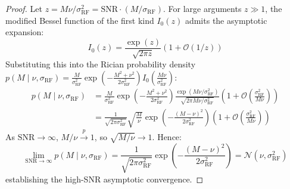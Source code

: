 \documentclass{article}
\begin{document}
\begin{proof}
Let $z = M \nu / \sigma_{\text{RF}}^2 = \text{SNR} \cdot (M / \sigma_{\text{RF}})$. For large arguments $z \gg 1$, the modified Bessel function of the first kind $I_0(z)$ admits the asymptotic expansion:
\begin{equation}
    I_0(z) = \frac{\exp(z)}{\sqrt{2\pi z}} \left( 1 + \mathcal{O}(1/z) \right)
\end{equation}
Substituting this into the Rician probability density $p(M \mid \nu, \sigma_{\text{RF}}) = \frac{M}{\sigma_{\text{RF}}^2} \exp\left(-\frac{M^2 + \nu^2}{2\sigma_{\text{RF}}^2}\right) I_0\left(\frac{M\nu}{\sigma_{\text{RF}}^2}\right)$:
\begin{align}
    p(M \mid \nu, \sigma_{\text{RF}}) &= \frac{M}{\sigma_{\text{RF}}^2} \exp\left(-\frac{M^2 + \nu^2}{2\sigma_{\text{RF}}^2}\right) \frac{\exp(M\nu / \sigma_{\text{RF}}^2)}{\sqrt{2\pi M\nu / \sigma_{\text{RF}}^2}} \left( 1 + \mathcal{O}\left(\frac{\sigma_{\text{RF}}^2}{M\nu}\right) \right) \\
    &= \frac{1}{\sqrt{2\pi \sigma_{\text{RF}}^2}} \sqrt{\frac{M}{\nu}} \exp\left( - \frac{(M - \nu)^2}{2\sigma_{\text{RF}}^2} \right) \left( 1 + \mathcal{O}\left(\frac{\sigma_{\text{RF}}^2}{M\nu}\right) \right)
\end{align}
As $\text{SNR} \to \infty$, $M / \nu \xrightarrow{p} 1$, so $\sqrt{M/\nu} \to 1$. Hence:
\begin{equation}
    \lim_{\text{SNR} \to \infty} p(M \mid \nu, \sigma_{\text{RF}}) = \frac{1}{\sqrt{2\pi \sigma_{\text{RF}}^2}} \exp\left( - \frac{(M - \nu)^2}{2\sigma_{\text{RF}}^2} \right) = \mathcal{N}(\nu, \sigma_{\text{RF}}^2)
\end{equation}
establishing the high-SNR asymptotic convergence.
\end{proof}
\end{document}
